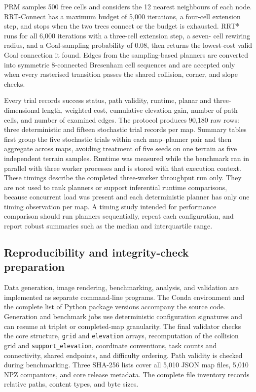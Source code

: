 \documentclass[11pt]{article}
\begin{document}
PRM samples 500 free cells and considers the 12 nearest neighbours of each
node. RRT-Connect has a maximum budget of 5,000 iterations, a four-cell
extension step, and stops when the two trees connect or the budget is exhausted.
RRT* runs for all 6,000 iterations with a three-cell extension step, a seven-
cell rewiring radius, and a Goal-sampling probability of 0.08, then returns the
lowest-cost valid Goal connection it found. Edges from the sampling-based
planners are converted into symmetric 8-connected Bresenham cell sequences and
are accepted only when every rasterised transition passes the shared collision,
corner, and slope checks.

Every trial records success status, path validity, runtime, planar and three-
dimensional length, weighted cost, cumulative elevation gain, number of path
cells, and number of examined edges. The protocol produces 90,180 raw rows:
three deterministic and fifteen stochastic trial records per map. Summary
tables first group the five stochastic trials within each map--planner pair and
then aggregate across maps, avoiding treatment of five seeds on one terrain as
five independent terrain samples. Runtime was measured while the benchmark ran
in parallel with three worker processes and is stored with that execution
context.
These timings describe the completed three-worker throughput run only. They are
not used to rank planners or support inferential runtime comparisons, because
concurrent load was present and each deterministic planner has only one timing
observation per map. A timing study intended for performance comparison should
run planners sequentially, repeat each configuration, and report robust
summaries such as the median and interquartile range.

\subsection{Reproducibility and integrity-check preparation}

Data generation, image rendering, benchmarking, analysis, and validation are
implemented as separate command-line programs. The Conda environment and the
complete list of Python package versions accompany the source code. Generation
and benchmark jobs use deterministic configuration signatures and can resume
at triplet or completed-map granularity. The final validator checks the core
structure, \texttt{grid} and \texttt{elevation} arrays, recomputation of the
collision grid and \texttt{support\_elevation}, coordinate conventions, task
counts and connectivity, shared endpoints, and difficulty ordering. Path
validity is checked during benchmarking. Three SHA-256 lists cover all 5,010
JSON map files, 5,010 NPZ companions, and core release metadata. The complete
file inventory records relative paths,
content types, and byte sizes.
\end{document}
